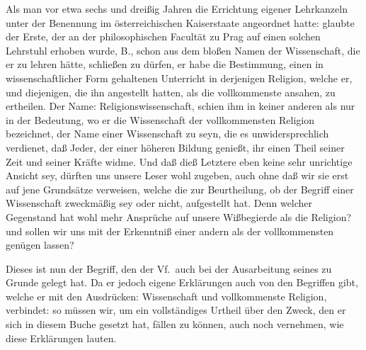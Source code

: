 \clearpage\ifnackt\else\linenumbers\fi%
{}\noindent{}\noindent
Als man vor etwa sechs und dreißig Jahren die Errichtung eigener Lehrkanzeln unter der Benennung  im österreichischen Kaiserstaate angeordnet hatte: glaubte der Erste, der an der philosophischen Facultät zu Prag auf einen solchen Lehrstuhl erhoben wurde, B., schon aus dem bloßen Namen der Wissenschaft, die er zu lehren hätte, schließen zu dürfen, er habe die Bestimmung, einen in wissenschaftlicher Form gehaltenen Unterricht in derjenigen Religion, welche er, und diejenigen, die ihn angestellt hatten, als die vollkommenste ansahen, zu ertheilen. Der Name: Religionswissenschaft, schien ihm in keiner anderen als nur in der Bedeutung, wo er die Wissenschaft der vollkommensten Religion bezeichnet, der Name einer Wissenschaft zu seyn, die es unwidersprechlich verdienet, daß Jeder, der einer höheren Bildung genießt, ihr einen Theil seiner Zeit und seiner Kräfte widme. Und daß dieß Letztere eben keine sehr unrichtige Ansicht sey, dürften uns unsere Leser wohl zugeben, auch ohne daß wir sie erst auf jene Grundsätze verweisen, welche die  zur Beurtheilung, ob der Begriff einer Wissenschaft zweckmäßig sey oder nicht, aufgestellt hat. Denn welcher Gegenstand hat wohl mehr Ansprüche auf unsere Wißbegierde als die Religion? und sollen wir uns mit der Erkenntniß einer andern als der vollkommensten genügen lassen? \par 
Dieses ist nun der Begriff, den der Vf.\ auch bei der Ausarbeitung seines  zu Grunde gelegt hat. Da er jedoch eigene Erklärungen auch von den Begriffen gibt, welche er mit den Ausdrücken: Wissenschaft und vollkommenste Religion, verbindet: so müssen wir, um ein vollständiges Urtheil über den Zweck, den er sich in diesem Buche gesetzt hat, fällen zu können, auch noch vernehmen, wie diese Erklärungen lauten. \par 
